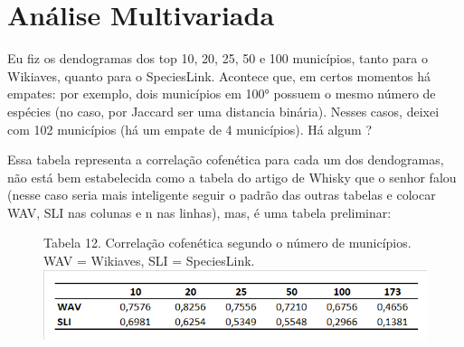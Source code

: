 \section{Análise Multivariada}

Eu fiz os dendogramas dos top 10, 20, 25, 50 e 100 municípios, tanto para o Wikiaves, quanto para o SpeciesLink. Acontece que, em certos momentos há empates: por exemplo, dois municípios em 100° possuem o mesmo número de espécies (no caso, por Jaccard ser uma distancia binária). Nesses casos, deixei com 102 municípios (há um empate de 4 municípios). Há algum ?

Essa tabela representa a correlação cofenética para cada um dos dendogramas, não está bem estabelecida como a tabela do artigo de Whisky que o senhor falou (nesse caso seria mais inteligente seguir o padrão das outras tabelas e colocar WAV, SLI nas colunas e n nas linhas), mas, é uma tabela preliminar:

\begin{figure}[h!]
{\scriptsize Tabela 12. Correlação cofenética segundo o número de municípios. WAV = Wikiaves, SLI = SpeciesLink.}
\centering
\includegraphics{Tabelas/12.png}
\end{figure}
